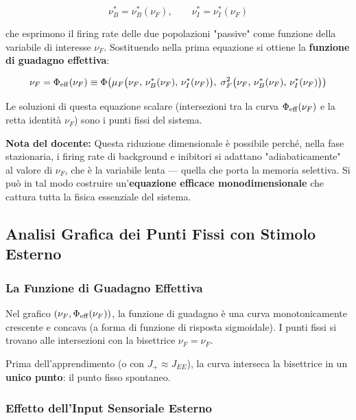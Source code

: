 \begin{equation}
\nu_B^* = \nu_B^*(\nu_F), \qquad \nu_I^* = \nu_I^*(\nu_F)
\end{equation}

che esprimono il firing rate delle due popolazioni "passive" come funzione della variabile di interesse $\nu_F$. Sostituendo nella prima equazione si ottiene la \textbf{funzione di guadagno effettiva}:

\begin{equation}
\nu_F = \Phi_{\rm eff}(\nu_F) \equiv \Phi\!\left(\mu_F\bigl(\nu_F,\, \nu_B^*(\nu_F),\, \nu_I^*(\nu_F)\bigr),\; \sigma_F^2\bigl(\nu_F,\, \nu_B^*(\nu_F),\, \nu_I^*(\nu_F)\bigr)\right)
\end{equation}

Le soluzioni di questa equazione scalare (intersezioni tra la curva $\Phi_{\rm eff}(\nu_F)$ e la retta identità $\nu_F$) sono i punti fissi del sistema.

\begin{tcolorbox}[colback=gray!5, colframe=gray!40, arc=2mm, boxrule=0.5pt]
\textbf{Nota del docente:} Questa riduzione dimensionale è possibile perché, nella fase stazionaria, i firing rate di background e inibitori si adattano "adiabaticamente" al valore di $\nu_F$, che è la variabile lenta — quella che porta la memoria selettiva. Si può in tal modo costruire un'\textbf{equazione efficace monodimensionale} che cattura tutta la fisica essenziale del sistema.
\end{tcolorbox}


\subsection{Analisi Grafica dei Punti Fissi con Stimolo Esterno}

\subsubsection{La Funzione di Guadagno Effettiva}

Nel grafico $(\nu_F, \Phi_{\rm eff}(\nu_F))$, la funzione di guadagno è una curva monotonicamente crescente e concava (a forma di funzione di risposta sigmoidale). I punti fissi si trovano alle intersezioni con la bisettrice $\nu_F = \nu_F$.

Prima dell'apprendimento (o con $J_+ \approx J_{EE}$), la curva interseca la bisettrice in un \textbf{unico punto}: il punto fisso spontaneo.

\subsubsection{Effetto dell'Input Sensoriale Esterno}

